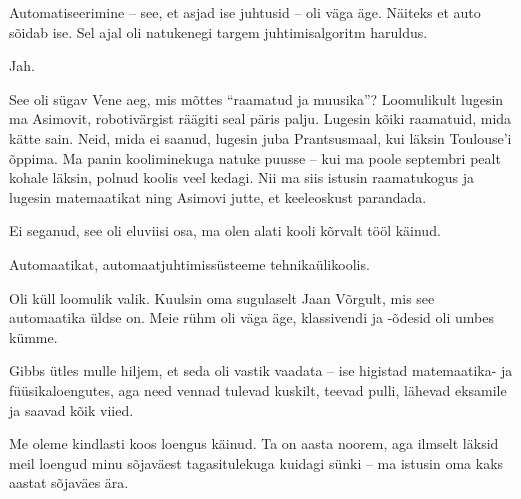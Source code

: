 
Automatiseerimine -- see, et asjad ise juhtusid -- oli väga äge. Näiteks et
auto sõidab ise. Sel ajal oli natukenegi targem 
juhtimisalgoritm haruldus.


Jah.


See oli sügav Vene aeg, mis mõttes \enquote{raamatud ja muusika}? 
Loomulikult lugesin ma Asimovit, robotivärgist räägiti seal päris palju. Lugesin kõiki 
raamatuid, mida kätte sain. Neid, mida ei saanud, lugesin 
juba Prantsusmaal, kui läksin Toulouse'i õppima. Ma panin 
kooliminekuga natuke puusse -- kui ma poole septembri pealt kohale läksin, 
polnud koolis veel kedagi. Nii ma siis 
istusin raamatukogus ja lugesin matemaatikat ning Asimovi jutte, et keeleoskust parandada.


Ei seganud, see oli eluviisi osa, ma olen alati kooli kõrvalt tööl 
käinud.


Automaatikat, automaatjuhtimissüsteeme tehnikaülikoolis.


Oli küll loomulik valik. Kuulsin oma sugulaselt Jaan 
Võrgult, mis 
see automaatika üldse on. Meie rühm oli väga äge, klassivendi ja -õdesid
oli umbes kümme. 

Gibbs ütles mulle hiljem, et seda oli 
vastik vaadata -- ise higistad matemaatika- ja füüsikaloengutes, aga 
need vennad tulevad kuskilt, teevad pulli, lähevad eksamile ja saavad 
kõik viied. 


Me oleme kindlasti koos loengus käinud. Ta on aasta noorem, aga ilmselt läksid meil loengud minu sõjaväest tagasitulekuga kuidagi sünki -- ma istusin oma kaks aastat sõjaväes ära.


